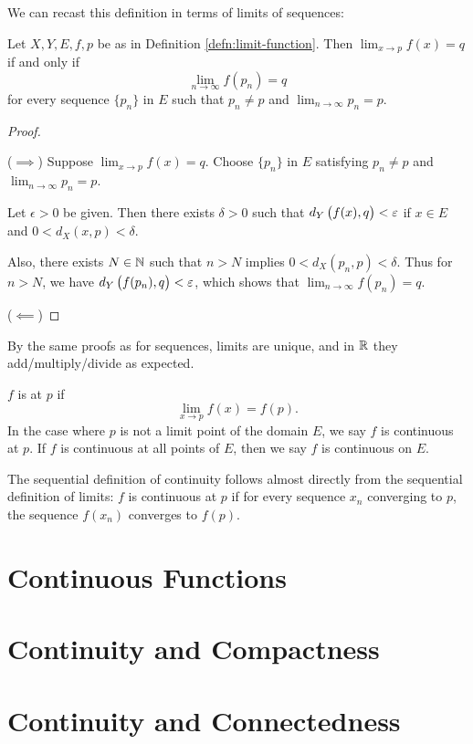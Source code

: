 We can recast this definition in terms of limits of sequences:
\begin{proposition}
Let $X,Y,E,f,p$ be as in Definition \ref{defn:limit-function}. Then $\displaystyle\lim_{x\to p}f(x)=q$ if and only if
\[\lim_{n\to\infty}f(p_n)=q\]
for every sequence $\{p_n\}$ in $E$ such that $p_n \neq p$ and $\displaystyle\lim_{n\to\infty}p_n=p$.
\end{proposition}

\begin{proof} \

($\implies$) Suppose $\displaystyle\lim_{x\to p}f(x)=q$. Choose $\{p_n\}$ in $E$ satisfying $p_n \neq p$ and $\displaystyle\lim_{n\to\infty}p_n=p$.

Let $\epsilon>0$ be given. Then there exists $\delta>0$ such that $d_Y\left(f(x),q\right)<\varepsilon$ if $x\in E$ and $0<d_X(x,p)<\delta$.

Also, there exists $N\in\mathbb N$ such that $n>N$ implies $0<d_X(p_n,p)<\delta$. Thus for $n>N$, we have $d_Y\left(f(p_n),q\right)<\varepsilon$, which shows that $\displaystyle\lim_{n\to\infty}f(p_n)=q$.

($\impliedby$) 
\end{proof}

By the same proofs as for sequences, limits are unique, and in $\mathbb R$ they add/multiply/divide as expected.

\begin{definition}
$f$ is  at $p$ if
\[ \lim_{x\to p}f(x) = f(p). \]
In the case where $p$ is not a limit point of the domain $E$, we say $f$ is continuous at $p$. If $f$ is continuous at all points of $E$, then we say $f$ is continuous on $E$.
\end{definition}

The sequential definition of continuity follows almost directly from the sequential definition of limits: 
$f$ is continuous at $p$ if for every sequence $x_n$ converging to $p$, the sequence $f(x_n)$ converges to $f(p)$.



\section{Continuous Functions}

\section{Continuity and Compactness}

\section{Continuity and Connectedness}

